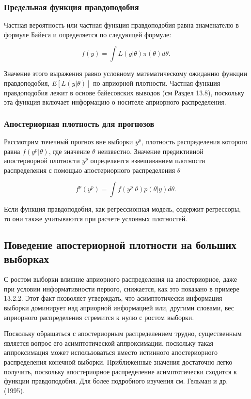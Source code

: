 \subsubsection*{Предельная функция правдоподобия}

Частная вероятность или частная функция правдоподобия равна знаменателю в формуле Байеса и определяется по следующей формуле: 

\begin{equation}
f(y)=\int{L(y|\theta)}\pi(\theta)d\theta.
\end{equation}

Значение этого выражения равно условному математическому ожиданию функции правдоподобия, $E[L(y|\theta)]$ по априорной плотности. Частная функция правдоподобия лежит в основе байесовских выводов (см Раздел 13.8), поскольку эта функция включает информацию о носителе априорного распределения.

\subsubsection*{Апостериорная плотность для прогнозов}

Рассмотрим точечный прогноз вне выборки $y^p$, плотность распределения которого равна $f(y^p|\theta)$, где значение $\theta$ неизвестно. Значение предиктивной апостериорной плотности $y^p$ определяется взвешиванием плотности распределения с помощью апостериорного  распределения $\theta$

\begin{equation}
f^{p}(y^p)=\int{f(y^p|\theta)p(\theta|y)d\theta}.
\end{equation}

Если  функция правдоподобия, как регрессионная модель, содержит регрессоры, то они также учитываются при расчете условных плотностей. 

\subsection{Поведение апостериорной плотности на больших выборках}

С ростом выборки влияние априорного распределения на апостериорное, даже при условии информативности первого, снижается, как это показано в примере 13.2.2. Этот факт позволяет утверждать, что асимптотически информация выборки доминирует над априорной информацией или, другими словами, вес априорного распределения  стремится к нулю с ростом выборки.

Поскольку обращаться с апостериорным распределением трудно, существенным является вопрос его асимптотической аппроксимации, поскольку такая аппроксимация может использоваться вместо истинного апостериорного распределения конечной выборки. Приближенные значения достаточно легко получить, поскольку апостериорное распределение асимптотически сходится к функции правдоподобия. Для более подробного изучения см. Гельман и др. (1995).

